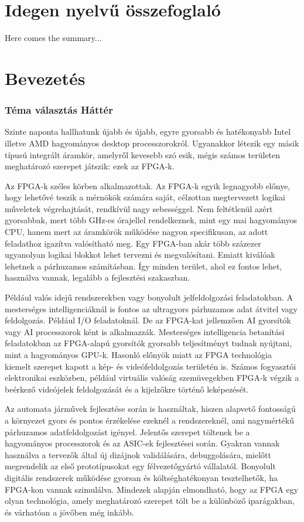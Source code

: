 \documentclass[a4paper,12pt,oneside]{book}
\begin{document}
\chapter{Idegen nyelvű összefoglaló}
Here comes the summary...


\chapter{Bevezetés}
\subsection{Téma választás Háttér}
Szinte naponta hallhatunk újabb és újabb, egyre gyorsabb és hatékonyabb Intel illetve AMD hagyományos desktop processzorokról. Ugyanakkor létezik egy másik típusú integrált áramkör, amelyről kevesebb szó esik, mégis számos területen meghatározó szerepet játszik: ezek az FPGA-k. 

Az FPGA-k széles körben alkalmazottak. Az FPGA-k egyik legnagyobb előnye, hogy lehetővé teszik a mérnökök számára saját, célzottan megtervezett logikai műveletek végrehajtását, rendkívül nagy sebességgel. Nem feltétlenül azért gyorsabbak, mert több GHz-es órajellel rendelkeznek, mint egy mai hagyományos CPU, hanem mert az áramkörök működése nagyon specifikusan, az adott feladathoz igazítva valósítható meg. Egy FPGA-ban akár több százezer ugyanolyan logikai blokkot lehet tervezni és megvalósítani. Emiatt kiválóak lehetnek a párhuzamos számításban. Így minden terület, ahol ez fontos lehet, használva vannak, legalább a fejlesztési szakaszban. 

Például valós idejű rendszerekben vagy bonyolult jelfeldolgozási feladatokban. A mesterséges intelligenciáknál is fontos az ultragyors párhuzamos adat átvitel vagy feldolgozás. Például I/O feladatoknál. De az FPGA-kat jellemzően AI gyorsítók vagy AI processzorok ként is alkalmazzák. Mesterséges intelligencia betanítási feladatokban az FPGA-alapú gyorsítók gyorsabb teljesítményt tudnak nyújtani, mint a hagyományos GPU-k. Hasonló előnyök miatt az FPGA technológia kiemelt szerepet kapott a kép- és videófeldolgozás területén is. Számos fogyasztói elektronikai eszközben, például virtuális valóság szemüvegekben FPGA-k végzik a beérkező videójelek feldolgozását és a kijelzőkre történő leképezését. 

Az automata járművek fejlesztése során is használtak, hiszen alapvető fontosságú a környezet gyors és pontos érzékelése ezeknél a rendszereknél, ami nagymértékű párhuzamos adatfeldolgozást igényel. Jelentős szerepet töltenek be a hagyományos processzorok és az ASIC-ek fejlesztései során. Gyakran vannak használva a tervezők által új dizájnok validálására, debuggolására, mielőtt megrendelik az első prototípusokat egy félvezetőgyártó vállalatól. Bonyolult digitális rendszerek működése gyorsan és költséghatékonyan tesztelhetők, ha FPGA-kon vannak szimulálva. Mindezek alapján elmondható, hogy az FPGA egy olyan technológia, amely meghatározó szerepet tölt be a különböző iparágakban, és várhatóan a jövőben még inkább. 
\end{document}
